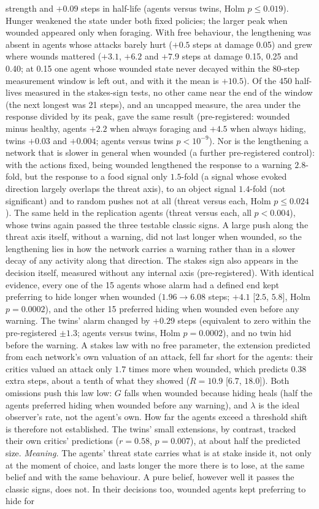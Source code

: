 \documentclass[11pt]{article}
\begin{document}
strength and $+0.09$ steps in half-life (agents versus twins, Holm $p\le0.019$). Hunger weakened the state under both fixed policies; the larger peak when wounded appeared only when foraging. With free behaviour, the lengthening was absent in agents whose attacks barely hurt ($+0.5$ steps at damage 0.05) and grew where wounds mattered ($+3.1$, $+6.2$ and $+7.9$ steps at damage 0.15, 0.25 and 0.40; at 0.15 one agent whose wounded state never decayed within the 80-step measurement window is left out, and with it the mean is $+10.5$). Of the 450 half-lives measured in the stakes-sign tests, no other came near the end of the window (the next longest was 21 steps), and an uncapped measure, the area under the response divided by its peak, gave the same result (pre-registered: wounded minus healthy, agents $+2.2$ when always foraging and $+4.5$ when always hiding, twins $+0.03$ and $+0.004$; agents versus twins $p<10^{-9}$). Nor is the lengthening a network that is slower in general when wounded (a further pre-registered control): with the actions fixed, being wounded lengthened the response to a warning $2.8$-fold, but the response to a food signal only $1.5$-fold (a signal whose evoked direction largely overlaps the threat axis), to an object signal $1.4$-fold (not significant) and to random pushes not at all (threat versus each, Holm $p\le0.024$). The same held in the replication agents (threat versus each, all $p<0.004$), whose twins again passed the three testable classic signs. A large push along the threat axis itself, without a warning, did not last longer when wounded, so the lengthening lies in how the network carries a warning rather than in a slower decay of any activity along that direction. The stakes sign also appears in the decision itself, measured without any internal axis (pre-registered). With identical evidence, every one of the 15 agents whose alarm had a defined end kept preferring to hide longer when wounded ($1.96\to6.08$ steps; $+4.1$ [$2.5$, $5.8$], Holm $p=0.0002$), and the other 15 preferred hiding when wounded even before any warning. The twins' alarm changed by $+0.29$ steps (equivalent to zero within the pre-registered $\pm1.3$; agents versus twins, Holm $p=0.0002$), and no twin hid before the warning. A stakes law with no free parameter, the extension predicted from each network's own valuation of an attack, fell far short for the agents: their critics valued an attack only $1.7$ times more when wounded, which predicts $0.38$ extra steps, about a tenth of what they showed ($R=10.9$ [$6.7$, $18.0$]). Both omissions push this law low: $G$ falls when wounded because hiding heals (half the agents preferred hiding when wounded before any warning), and $\lambda$ is the ideal observer's rate, not the agent's own. How far the agents exceed a threshold shift is therefore not established. The twins' small extensions, by contrast, tracked their own critics' predictions ($r=0.58$, $p=0.007$), at about half the predicted size. \emph{Meaning.} The agents' threat state carries what is at stake inside it, not only at the moment of choice, and lasts longer the more there is to lose, at the same belief and with the same behaviour. A pure belief, however well it passes the classic signs, does not. In their decisions too, wounded agents kept preferring to hide for 
\end{document}
